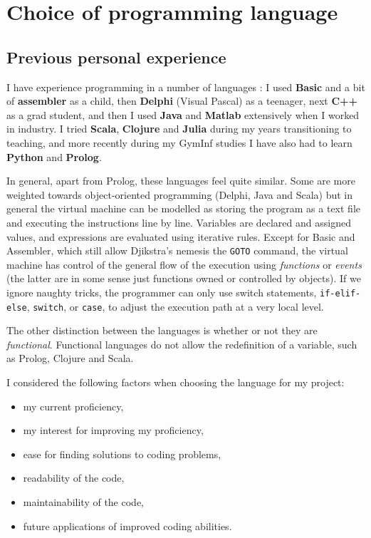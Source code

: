 \documentclass[10pt]{article}
\begin{document}
\section{Choice of programming language} \label{language}

\subsection{Previous personal experience}

I have experience programming in a number of languages : I used \textbf{Basic} and a bit of \textbf{assembler} as a child, then \textbf{Delphi} (Visual Pascal) as a teenager, next \textbf{C++} as a grad student, and then I used \textbf{Java} and \textbf{Matlab} extensively when I worked in industry. I tried \textbf{Scala}, \textbf{Clojure} and \textbf{Julia} during my years transitioning to teaching, and more recently during my GymInf studies I have also had to learn \textbf{Python} and \textbf{Prolog}.

In general, apart from Prolog, these languages feel quite similar. Some are more weighted towards object-oriented programming (Delphi, Java and Scala) but in general the virtual machine can be modelled as storing the program as a text file and executing the instructions line by line. Variables are declared and assigned values, and expressions are evaluated using iterative rules. Except for Basic and Assembler, which still allow Djikstra's nemesis the \texttt{GOTO} command, the virtual machine has control of the general flow of the execution using \emph{functions} or \emph{events} (the latter are in some sense just functions owned or controlled by objects). If we ignore naughty tricks, the programmer can only use switch statements, \texttt{if-elif-else}, \texttt{switch}, or \texttt{case}, to adjust the execution path at a very local level.

The other distinction between the languages is whether or not they are \emph{functional}. Functional languages do not allow the redefinition of a variable, such as Prolog, Clojure and Scala. 

I considered the following factors when choosing the language for my project:
\begin{itemize}
\item my current proficiency,
\item my interest for improving my proficiency,
\item ease for finding solutions to coding problems,
\item readability of the code,
\item maintainability of the code,
\item future applications of improved coding abilities.
\end{itemize}
\end{document}
